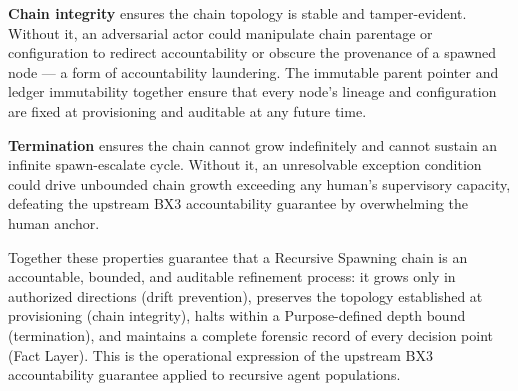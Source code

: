 \medskip\textbf{Chain integrity} ensures the chain topology is stable and tamper-evident. Without it, an adversarial actor could manipulate chain parentage or configuration to redirect accountability or obscure the provenance of a spawned node --- a form of accountability laundering. The immutable parent pointer and ledger immutability together ensure that every node's lineage and configuration are fixed at provisioning and auditable at any future time.

\medskip\textbf{Termination} ensures the chain cannot grow indefinitely and cannot sustain an infinite spawn-escalate cycle. Without it, an unresolvable exception condition could drive unbounded chain growth exceeding any human's supervisory capacity, defeating the upstream BX3 accountability guarantee by overwhelming the human anchor.

Together these properties guarantee that a Recursive Spawning chain is an accountable, bounded, and auditable refinement process: it grows only in authorized directions (drift prevention), preserves the topology established at provisioning (chain integrity), halts within a Purpose-defined depth bound (termination), and maintains a complete forensic record of every decision point (Fact Layer). This is the operational expression of the upstream BX3 accountability guarantee applied to recursive agent populations.